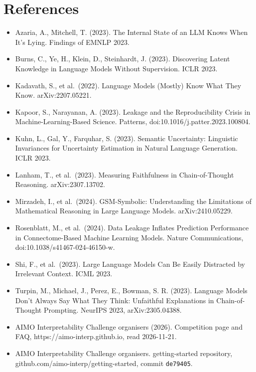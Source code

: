 \documentclass{article}
\providecommand{\tightlist}{\setlength{\itemsep}{0pt}\setlength{\parskip}{0pt}}
\begin{document}
\section*{References}

\begin{itemize}
\tightlist
\item
  Azaria, A., Mitchell, T. (2023). The Internal State of an LLM Knows When It's Lying. Findings of
  EMNLP 2023.
\item
  Burns, C., Ye, H., Klein, D., Steinhardt, J. (2023). Discovering Latent Knowledge in Language
  Models Without Supervision. ICLR 2023.
\item
  Kadavath, S., et al.~(2022). Language Models (Mostly) Know What They Know. arXiv:2207.05221.
\item
  Kapoor, S., Narayanan, A. (2023). Leakage and the Reproducibility Crisis in Machine-Learning-Based
  Science. Patterns, doi:10.1016/j.patter.2023.100804.
\item
  Kuhn, L., Gal, Y., Farquhar, S. (2023). Semantic Uncertainty: Linguistic Invariances for
  Uncertainty Estimation in Natural Language Generation. ICLR 2023.
\item
  Lanham, T., et al.~(2023). Measuring Faithfulness in Chain-of-Thought Reasoning.
  arXiv:2307.13702.
\item
  Mirzadeh, I., et al.~(2024). GSM-Symbolic: Understanding the Limitations of Mathematical
  Reasoning in Large Language Models. arXiv:2410.05229.
\item
  Rosenblatt, M., et al.~(2024). Data Leakage Inflates Prediction Performance in Connectome-Based
  Machine Learning Models. Nature Communications, doi:10.1038/s41467-024-46150-w.
\item
  Shi, F., et al.~(2023). Large Language Models Can Be Easily Distracted by Irrelevant Context.
  ICML 2023.
\item
  Turpin, M., Michael, J., Perez, E., Bowman, S. R. (2023). Language Models Don't Always Say What
  They Think: Unfaithful Explanations in Chain-of-Thought Prompting. NeurIPS 2023, arXiv:2305.04388.
\item
  AIMO Interpretability Challenge organisers (2026). Competition page and FAQ, https://aimo-interp.github.io, read 2026-11-21.
\item
  AIMO Interpretability Challenge organisers. getting-started repository,
  github.com/aimo-interp/getting-started, commit \texttt{de79405}.
\end{itemize}
\end{document}
